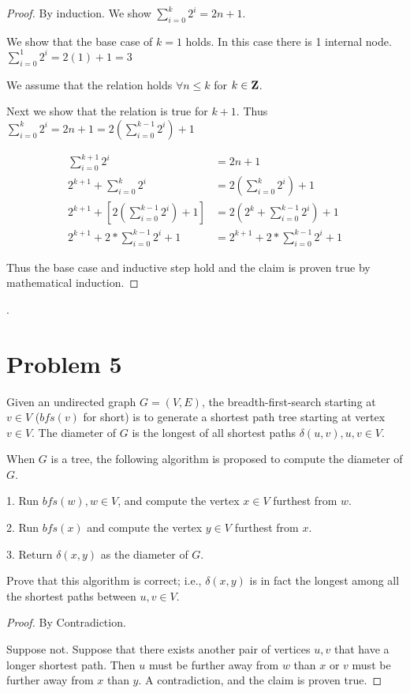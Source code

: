 \documentclass[11pt]{article}
\begin{document}
\begin{proof}
By induction. We show $\sum _{i = 0}^{k} 2^i = 2n + 1$.

We show that the base case of $k = 1$ holds. In this case there is 1 internal node. $\sum _{i = 0}^{1} 2^i = 2(1) + 1 = 3$

We assume that the relation holds $\forall n \leq k$ for $k \in \mathbf{Z}$.

Next we show that the relation is true for $k + 1$. Thus $\sum _{i = 0}^{k} 2^i = 2n + 1 = 2 \left( \sum _{i = 0}^{k-1} 2^i \right) + 1$

\begin{equation}
\begin{split}
\sum _{i = 0}^{k + 1} 2^i &= 2n + 1\\
2 ^{k+1} + \sum _{i = 0}^{k} 2^i &= 2 (\sum _{i = 0}^{k} 2^i) + 1\\
2 ^{k+1} + \left [2 \left( \sum _{i = 0}^{k-1} 2^i \right) + 1 \right ] &= 2 \left( 2^k + \sum _{i = 0}^{k-1} 2^i \right) + 1\\
2 ^{k+1} + 2 * \sum _{i = 0}^{k-1} 2^i + 1 &= 2^{k + 1} + 2 * \sum _{i = 0}^{k-1} 2^i + 1
\end{split}
\end{equation} 

Thus the base case and inductive step hold and the claim is proven true by mathematical induction.
\end{proof}

\newpage.
\section*{Problem 5}

Given an undirected graph $G=(V,E)$, the breadth-first-search starting at $v\in V$
($bfs(v)$ for short) is to generate a shortest path tree starting at vertex
$v\in V$. The diameter of $G$ is the longest of all shortest paths $\delta(u,v), u,v\in V$.
\newline

When $G$ is a tree, the following algorithm is proposed to compute the
diameter of $G$.
\newline

1. Run $bfs(w), w\in V$, and compute the vertex $x\in V$ furthest from $w$.

2. Run $bfs(x)$ and compute the vertex $y\in V$ furthest from $x$.

3. Return $\delta(x,y)$ as the diameter of $G$.
\newline

Prove that this algorithm is correct; i.e., $\delta(x,y)$ is in fact the
longest among all the shortest paths between $u,v\in V$.
\newline

\begin{proof}
By Contradiction.

Suppose not. Suppose that there exists another pair of vertices $u, v$ that have a longer shortest path. Then $u$ must be further away from $w$ than $x$ or $v$ must be further away from $x$ than $y$. A contradiction, and the claim is proven true.
\end{proof}
\end{document}
